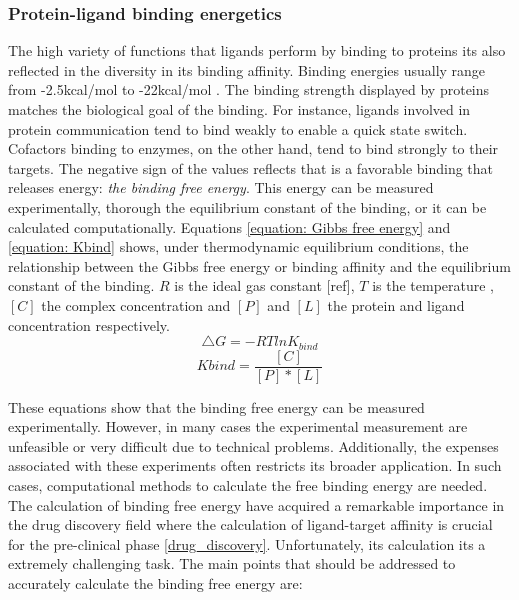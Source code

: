 \documentclass[12pt, a4paper,twoside]{tesi_upf}
\begin{document}
\subsubsection{Protein-ligand binding energetics}\label{binding_energetics}

\par The high variety of functions that ligands perform by binding to proteins its also reflected in the diversity in its binding affinity. Binding energies usually range from -2.5kcal/mol to -22kcal/mol \cite{Dunn2001}. The binding strength displayed by proteins matches the biological goal of the binding. For instance, ligands involved in protein communication tend to bind weakly to enable a quick state switch. Cofactors binding to enzymes, on the other hand,  tend to bind strongly to their targets.  The negative sign of the values reflects that is a favorable binding that releases energy: \textit{the binding free energy}.  This energy can be measured experimentally, thorough the equilibrium constant of the binding, or it can be calculated computationally. Equations \ref{equation: Gibbs free energy} and \ref{equation: Kbind} shows, under thermodynamic equilibrium conditions, the relationship between the Gibbs free energy or binding affinity and the equilibrium constant of the binding. $R$ is the ideal gas constant [ref], $T$ is the temperature , $[C]$ the complex concentration and $[P]$ and $[L]$ the protein and ligand concentration respectively. 
\begin{equation}\label{equation: Gibbs free energy}
\bigtriangleup G=-RTlnK_{bind} 
\end{equation}
\begin{equation}\label{equation: Kbind}
Kbind = \frac{[C]}{[P]*[L]}
\end{equation}
\par These equations show that the binding free energy can be measured experimentally. However, in many cases the experimental measurement are unfeasible or very difficult due to technical problems. Additionally, the expenses associated with these experiments often restricts its broader application. In such cases, computational methods to calculate the free binding energy are needed. The calculation of binding free energy have acquired a remarkable importance in the drug discovery field where the calculation of ligand-target affinity is crucial for the pre-clinical phase \ref{drug_discovery}. Unfortunately, its calculation its a extremely challenging task. The main points that should be addressed to accurately calculate the binding free energy are: 
\end{document}
